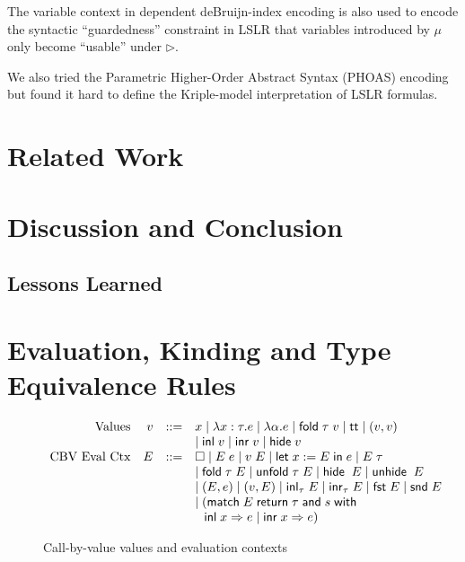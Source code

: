 \documentclass[preprint]{sigplanconf}
\newcommand{\symlet}{\mathsf{let\;}}
\newcommand{\symin}{\mathsf{\;in\;}}
\newcommand{\symand}{\mathsf{\;and\;}}
\newcommand{\symmatch}{\mathsf{match}}
\newcommand{\symwith}{\mathsf{\;with\;}}
\newcommand{\symreturn}{\mathsf{\;return\;}}
\newcommand{\syminl}{\mathsf{inl}}
\newcommand{\syminr}{\mathsf{inr}}
\newcommand{\symfold}{\mathsf{fold}}
\newcommand{\symunfold}{\mathsf{unfold}}
\newcommand{\symhide}{\mathsf{hide}}
\newcommand{\symunhide}{\mathsf{unhide}}
\newcommand{\symtt}{\mathsf{tt}}
\newcommand{\later}{\triangleright}
\newcommand{\symfst}{\mathsf{fst}}
\newcommand{\symsnd}{\mathsf{snd}}
\begin{document}
The variable context in dependent deBruijn-index encoding is also used to encode the syntactic ``guardedness'' constraint in LSLR that variables introduced by $\mu$ only become ``usable'' under $\later$.

We also tried the Parametric Higher-Order Abstract Syntax (PHOAS) encoding but found it hard to define the Kriple-model interpretation of LSLR formulas.

\section{\label{section-related}Related Work}

\section{\label{section-discussion}Discussion and Conclusion}

\subsection{Lessons Learned}

\appendix

\section{\label{append1}Evaluation, Kinding and Type Equivalence Rules}

\begin{figure}
$$\begin{array}{rrcl}
  \textrm{Values} & v &::=& x \mid \lambda x:\tau.e \mid \lambda \alpha.e \mid \symfold\;\tau\;v \mid \symtt \mid (v,v) \\
  & & & \mid \syminl\;v \mid \syminr\;v \mid \symhide\; v \\
  \textrm{CBV Eval Ctx} & E &::=& \Box \mid E\;e \mid v\;E \mid \symlet x := E\symin e \mid E\;\tau \\
  & & & \mid \symfold\;\tau\;E \mid \symunfold\;\tau\;E \mid \symhide\;\;E \mid \symunhide\;\;E \\
  & & & \mid (E, e) \mid (v, E) \mid \syminl_\tau\;E \mid \syminr_\tau\;E \mid \symfst\;E \mid \symsnd\;E \\
  & & & \mid (\symmatch\;E\symreturn \tau \symand s \symwith \\
  & & & \hspace{.1in} \syminl\;x\Rightarrow e\;|\;\syminr\;x\Rightarrow e)
\end{array}$$
\caption{\label{eval-aux}Call-by-value values and evaluation contexts}
\end{figure}
\end{document}
